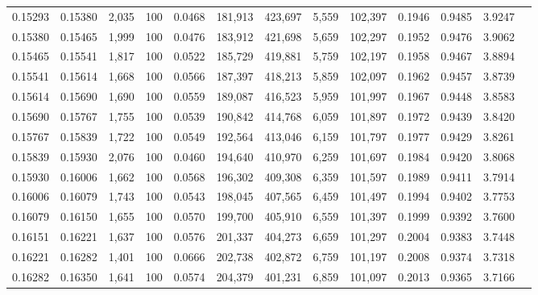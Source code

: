 \begin{tabular}{rrrrrrrrrrrrr}
0.15293 & 0.15380 & 2,035 & 100 &                                     0.0468 & 181,913 & 423,697 &   5,559 & 102,397 & 0.1946 & 0.9485 & 3.9247 \\
0.15380 & 0.15465 & 1,999 & 100 &                                     0.0476 & 183,912 & 421,698 &   5,659 & 102,297 & 0.1952 & 0.9476 & 3.9062 \\
0.15465 & 0.15541 & 1,817 & 100 &                                     0.0522 & 185,729 & 419,881 &   5,759 & 102,197 & 0.1958 & 0.9467 & 3.8894 \\
0.15541 & 0.15614 & 1,668 & 100 &                                     0.0566 & 187,397 & 418,213 &   5,859 & 102,097 & 0.1962 & 0.9457 & 3.8739 \\
0.15614 & 0.15690 & 1,690 & 100 &                                     0.0559 & 189,087 & 416,523 &   5,959 & 101,997 & 0.1967 & 0.9448 & 3.8583 \\
0.15690 & 0.15767 & 1,755 & 100 &                                     0.0539 & 190,842 & 414,768 &   6,059 & 101,897 & 0.1972 & 0.9439 & 3.8420 \\
0.15767 & 0.15839 & 1,722 & 100 &                                     0.0549 & 192,564 & 413,046 &   6,159 & 101,797 & 0.1977 & 0.9429 & 3.8261 \\
0.15839 & 0.15930 & 2,076 & 100 &                                     0.0460 & 194,640 & 410,970 &   6,259 & 101,697 & 0.1984 & 0.9420 & 3.8068 \\
0.15930 & 0.16006 & 1,662 & 100 &                                     0.0568 & 196,302 & 409,308 &   6,359 & 101,597 & 0.1989 & 0.9411 & 3.7914 \\
0.16006 & 0.16079 & 1,743 & 100 &                                     0.0543 & 198,045 & 407,565 &   6,459 & 101,497 & 0.1994 & 0.9402 & 3.7753 \\
0.16079 & 0.16150 & 1,655 & 100 &                                     0.0570 & 199,700 & 405,910 &   6,559 & 101,397 & 0.1999 & 0.9392 & 3.7600 \\
0.16151 & 0.16221 & 1,637 & 100 &                                     0.0576 & 201,337 & 404,273 &   6,659 & 101,297 & 0.2004 & 0.9383 & 3.7448 \\
0.16221 & 0.16282 & 1,401 & 100 &                                     0.0666 & 202,738 & 402,872 &   6,759 & 101,197 & 0.2008 & 0.9374 & 3.7318 \\
0.16282 & 0.16350 & 1,641 & 100 &                                     0.0574 & 204,379 & 401,231 &   6,859 & 101,097 & 0.2013 & 0.9365 & 3.7166 \\

\end{tabular}

